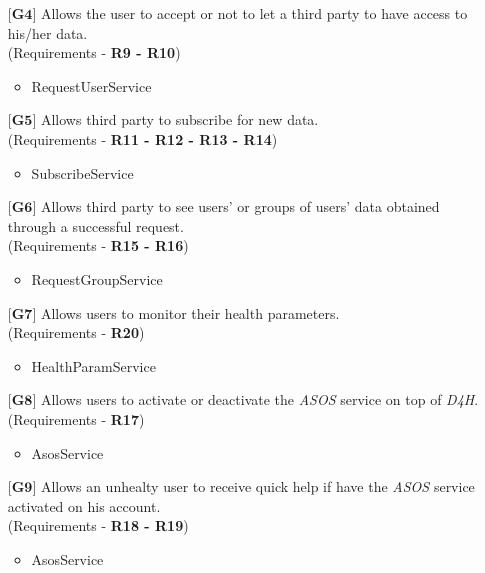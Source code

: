 \begin{itemize}
	\item[${\textbf{[G4]}}$] {Allows the user to accept or not to let a third party to have access to his/her data.\\(Requirements - 	\textbf{R9 - R10})}
	\begin{itemize}
		\item RequestUserService	
	\end{itemize}
	\item[${\textbf{[G5]}}$] {Allows third party to subscribe for new data.\\(Requirements - \textbf{R11 - R12 - R13 - R14})}
	\begin{itemize}
		\item SubscribeService	
	\end{itemize}
	\item[${\textbf{[G6]}}$] {Allows third party to see users' or groups of users' data obtained through a successful request.\\			(Requirements - \textbf{R15 - R16})}
	\begin{itemize}
		\item RequestGroupService	
	\end{itemize}
	\item[${\textbf{[G7]}}$] {Allows users to monitor their health parameters.\\(Requirements - \textbf{R20})}
	\begin{itemize}
		\item HealthParamService	
	\end{itemize}
	\item[${\textbf{[G8]}}$] {Allows users to activate or deactivate the \hbox{\emph{ASOS}} service on top of 					\hbox{\emph{D4H}}.\\(Requirements - \textbf{R17})}
	\begin{itemize}
		\item AsosService	
	\end{itemize}
	\item[${\textbf{[G9]}}$] {Allows an unhealty user to receive quick help if have the \hbox{\emph{ASOS}} service activated on 		his account.\\(Requirements - \textbf{R18 - R19})}
	\begin{itemize}
		\item AsosService	
	\end{itemize}	
\end{itemize}